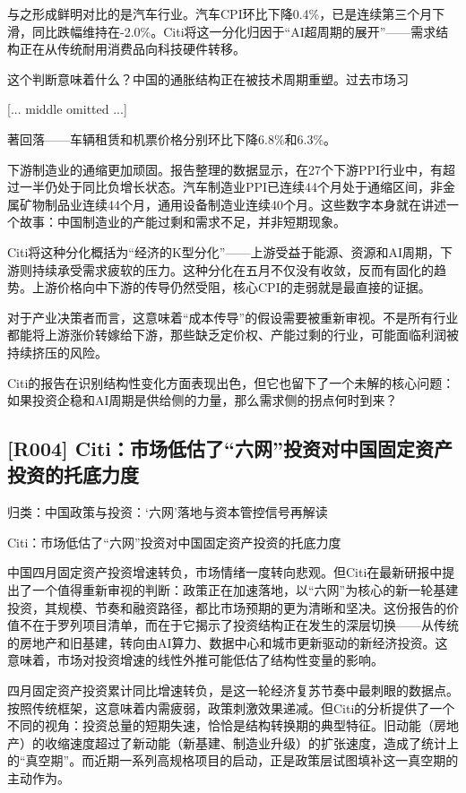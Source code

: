 \documentclass[11pt]{ctexart}
\begin{document}
与之形成鲜明对比的是汽车行业。汽车CPI环比下降0.4\%，已是连续第三个月下滑，同比跌幅维持在-2.0\%。Citi将这一分化归因于“AI超周期的展开”——需求结构正在从传统耐用消费品向科技硬件转移。

这个判断意味着什么？中国的通胀结构正在被技术周期重塑。过去市场习

[... middle omitted ...]

著回落——车辆租赁和机票价格分别环比下降6.8\%和6.3\%。

下游制造业的通缩更加顽固。报告整理的数据显示，在27个下游PPI行业中，有超过一半仍处于同比负增长状态。汽车制造业PPI已连续44个月处于通缩区间，非金属矿物制品业连续44个月，通用设备制造业连续40个月。这些数字本身就在讲述一个故事：中国制造业的产能过剩和需求不足，并非短期现象。

Citi将这种分化概括为“经济的K型分化”——上游受益于能源、资源和AI周期，下游则持续承受需求疲软的压力。这种分化在五月不仅没有收敛，反而有固化的趋势。上游价格向中下游的传导仍然受阻，核心CPI的走弱就是最直接的证据。

对于产业决策者而言，这意味着“成本传导”的假设需要被重新审视。不是所有行业都能将上游涨价转嫁给下游，那些缺乏定价权、产能过剩的行业，可能面临利润被持续挤压的风险。

Citi的报告在识别结构性变化方面表现出色，但它也留下了一个未解的核心问题：如果投资企稳和AI周期是供给侧的力量，那么需求侧的拐点何时到来？

\subsection{[R004] Citi：市场低估了“六网”投资对中国固定资产投资的托底力度}
{\small\color{refgray}归类：中国政策与投资：‘六网’落地与资本管控信号再解读}

Citi：市场低估了“六网”投资对中国固定资产投资的托底力度

中国四月固定资产投资增速转负，市场情绪一度转向悲观。但Citi在最新研报中提出了一个值得重新审视的判断：政策正在加速落地，以“六网”为核心的新一轮基建投资，其规模、节奏和融资路径，都比市场预期的更为清晰和坚决。这份报告的价值不在于罗列项目清单，而在于它揭示了投资结构正在发生的深层切换——从传统的房地产和旧基建，转向由AI算力、数据中心和城市更新驱动的新经济投资。这意味着，市场对投资增速的线性外推可能低估了结构性变量的影响。

四月固定资产投资累计同比增速转负，是这一轮经济复苏节奏中最刺眼的数据点。按照传统框架，这意味着内需疲弱，政策刺激效果递减。但Citi的分析提供了一个不同的视角：投资总量的短期失速，恰恰是结构转换期的典型特征。旧动能（房地产）的收缩速度超过了新动能（新基建、制造业升级）的扩张速度，造成了统计上的“真空期”。而近期一系列高规格项目的启动，正是政策层试图填补这一真空期的主动作为。
\end{document}
